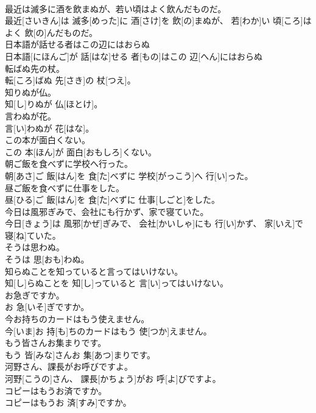 \documentclass[8pt]{extreport}
\begin{document}
\begin{CJK}{UTF8}{min}
\\	最近は滅多に酒を飲まぬが、若い頃はよく飲んだものだ。	
\\	最近[さいきん]は 滅多[めった]に 酒[さけ]を 飲[の]まぬが、 若[わか]い 頃[ころ]はよく 飲[の]んだものだ。
\\	日本語が話せる者はこの辺にはおらぬ	
\\	日本語[にほんご]が 話[はな]せる 者[もの]はこの 辺[へん]にはおらぬ
\\	転ばぬ先の杖。	
\\	転[ころ]ばぬ 先[さき]の 杖[つえ]。
\\	知りぬが仏。	
\\	知[し]りぬが 仏[ほとけ]。
\\	言わぬが花。	
\\	言[い]わぬが 花[はな]。
\\	この本が面白くない。	
\\	この 本[ほん]が 面白[おもしろ]くない。
\\	朝ご飯を食べずに学校へ行った。	
\\	朝[あさ]ご 飯[はん]を 食[た]べずに 学校[がっこう]へ 行[い]った。
\\	昼ご飯を食べずに仕事をした。	
\\	昼[ひる]ご 飯[はん]を 食[た]べずに 仕事[しごと]をした。
\\	今日は風邪ぎみで、会社にも行かず、家で寝ていた。	
\\	今日[きょう]は 風邪[かぜ]ぎみで、 会社[かいしゃ]にも 行[い]かず、 家[いえ]で 寝[ね]ていた。
\\	そうは思わぬ。	
\\	そうは 思[おも]わぬ。
\\	知らぬことを知っていると言ってはいけない。	
\\	知[し]らぬことを 知[し]っていると 言[い]ってはいけない。
\\	お急ぎですか。	
\\	お 急[いそ]ぎですか。
\\	今お持ちのカードはもう使えません。	
\\	今[いま]お 持[も]ちのカードはもう 使[つか]えません。
\\	もう皆さんお集まりです。	
\\	もう 皆[みな]さんお 集[あつ]まりです。
\\	河野さん、課長がお呼びですよ。	
\\	河野[こうの]さん、 課長[かちょう]がお 呼[よ]びですよ。
\\	コピーはもうお済ですか。	
\\	コピーはもうお 済[すみ]ですか。

\end{CJK}
\end{document}
